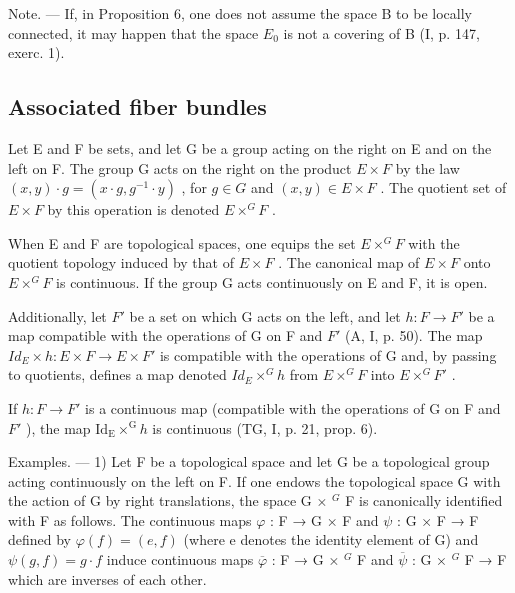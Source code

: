 Note. --- If, in Proposition 6, one does not assume the space B to be locally connected, it may happen that the space \(E_{0}\) is not a covering of B (I, p. 147, exerc. 1).

\subsection{Associated fiber bundles}

Let E and F be sets, and let G be a group acting on the right on E and on the left on F. The group G acts on the right on the product \(E \times F\) by the law \((x, y) \cdot g = (x \cdot g, g^{-1} \cdot y)\) , for \(g \in G\) and \((x, y) \in E \times F\) . The quotient set of \(E \times F\) by this operation is denoted \(E \times^{G} F\) .

When E and F are topological spaces, one equips the set \(E \times^{G} F\) with the quotient topology induced by that of \(E \times F\) . The canonical map of \(E \times F\) onto \(E \times^{G} F\) is continuous. If the group G acts continuously on E and F, it is open.

Additionally, let \(F'\) be a set on which G acts on the left, and let \(h: F \to F'\) be a map compatible with the operations of G on F and \(F'\) (A, I, p. 50). The map \(Id_{E} \times h: E \times F \to E \times F'\) is compatible with the operations of G and, by passing to quotients, defines a map denoted \(Id_{E} \times^{G} h\) from \(E \times^{G} F\) into \(E \times^{G} F'\) .

If \(h \colon F \to F'\) is a continuous map (compatible with the operations of G on F and \(F'\) ), the map \(\mathrm{Id}_{\mathrm{E}} \times^{\mathrm{G}} h\) is continuous (TG, I, p. 21, prop. 6).

Examples. --- 1) Let F be a topological space and let G be a topological group acting continuously on the left on F. If one endows the topological space G with the action of G by right translations, the space G × \(^{G}\) F is canonically identified with F as follows. The continuous maps \(\varphi\) : F → G × F and \(\psi\) : G × F → F defined by \(\varphi(f) = (e, f)\) (where e denotes the identity element of G) and \(\psi(g, f) = g \cdot f\) induce continuous maps \(\overline{\varphi}\) : F → G × \(^{G}\) F and \(\overline{\psi}\) : G × \(^{G}\) F → F which are inverses of each other.


